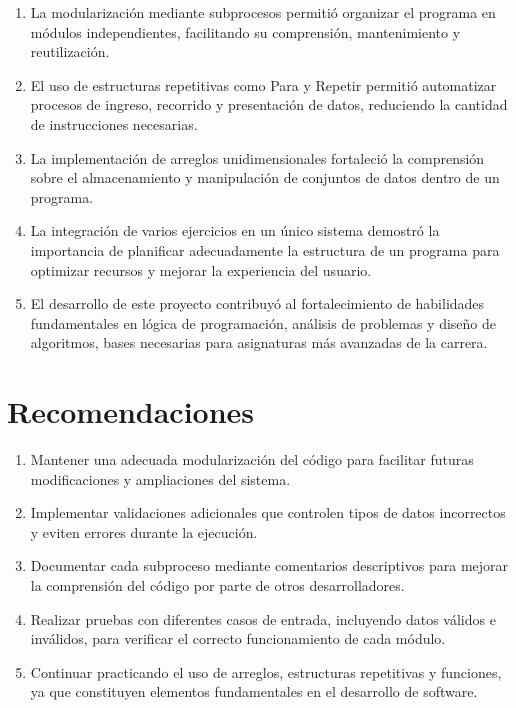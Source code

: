 \documentclass[12pt,a4paper]{article}
\begin{document}
\begin{enumerate}
	\item La modularización mediante subprocesos permitió organizar el programa en módulos independientes, facilitando su comprensión, mantenimiento y reutilización.
	\item El uso de estructuras repetitivas como Para y Repetir permitió automatizar procesos de ingreso, recorrido y presentación de datos, reduciendo la cantidad de instrucciones necesarias.
	\item La implementación de arreglos unidimensionales fortaleció la comprensión sobre el almacenamiento y manipulación de conjuntos de datos dentro de un programa.
	\item La integración de varios ejercicios en un único sistema demostró la importancia de planificar adecuadamente la estructura de un programa para optimizar recursos y mejorar la experiencia del usuario.
	\item El desarrollo de este proyecto contribuyó al fortalecimiento de habilidades fundamentales en lógica de programación, análisis de problemas y diseño de algoritmos, bases necesarias para asignaturas más avanzadas de la carrera.
\end{enumerate}

\section{\textcolor{azulUNEMI}{Recomendaciones}}


\begin{enumerate}
	\item Mantener una adecuada modularización del código para facilitar futuras modificaciones y ampliaciones del sistema.
	\item Implementar validaciones adicionales que controlen tipos de datos incorrectos y eviten errores durante la ejecución.
	\item Documentar cada subproceso mediante comentarios descriptivos para mejorar la comprensión del código por parte de otros desarrolladores.
	\item Realizar pruebas con diferentes casos de entrada, incluyendo datos válidos e inválidos, para verificar el correcto funcionamiento de cada módulo.
	\item Continuar practicando el uso de arreglos, estructuras repetitivas y funciones, ya que constituyen elementos fundamentales en el desarrollo de software.
\end{enumerate}
\end{document}
